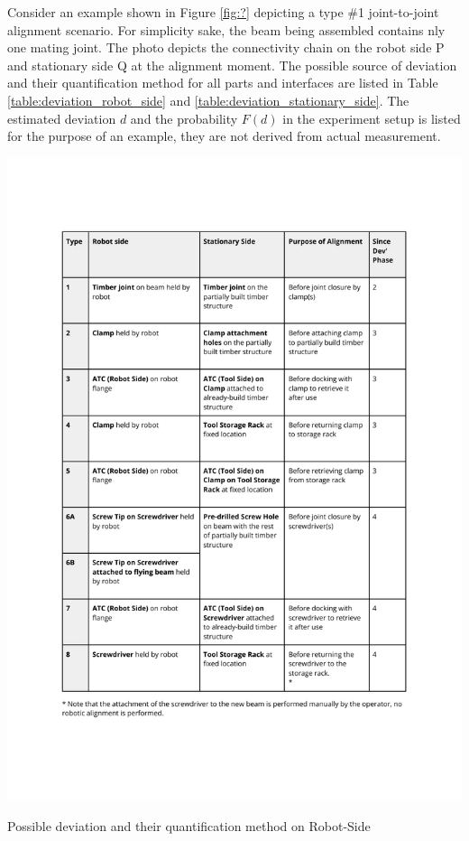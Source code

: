 \FloatBarrier



Consider an example shown in Figure \ref{fig:?} depicting a type \#1 joint-to-joint alignment scenario. For simplicity sake, the beam being assembled contains nly one mating joint. The photo depicts the connectivity chain on the robot side P and stationary side Q at the alignment moment. The possible source of deviation and their quantification method for all parts and interfaces are listed in Table \ref{table:deviation_robot_side} and \ref{table:deviation_stationary_side}. The estimated deviation $d$ and the probability $F(d)$ in the experiment setup is listed for the purpose of an example, they are not derived from actual measurement.


\begin{table}
    \includegraphics[page=3, trim=25.4mm 30mm 25.4mm 33mm, clip, width=\textwidth]{tables/Tables in Chapter 9 to 11.pdf}
    \caption{Possible deviation and their quantification method on Robot-Side}
    \label{table:deviation_robot_side}
\end{table}


